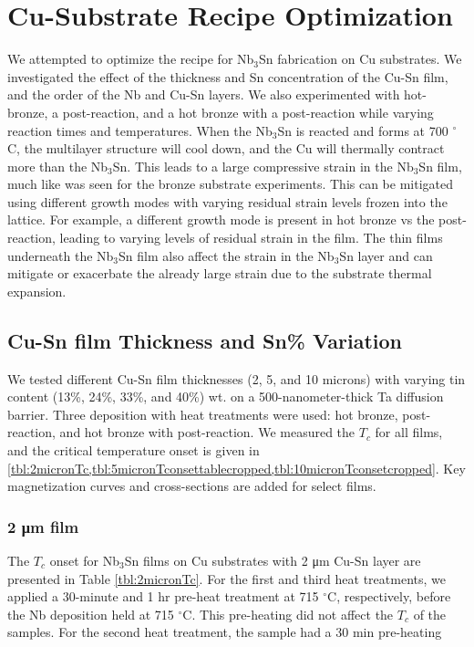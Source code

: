 
\chapter{Cu-Substrate Recipe Optimization}
    
We attempted to optimize the recipe for Nb$_3$Sn fabrication on Cu substrates. We investigated the effect of the thickness and Sn concentration of the Cu-Sn film, %
and the order of the Nb and Cu-Sn layers. We also experimented with hot-bronze, a post-reaction, and a hot bronze with a post-reaction while varying reaction times and temperatures. When the Nb$_3$Sn is reacted and forms at 700 $^{\circ}$C, the multilayer structure will cool down, and the Cu will thermally contract more than the Nb$_3$Sn. This leads to a large compressive strain in the Nb$_3$Sn film, much like was seen for the bronze substrate experiments. This can be mitigated using different growth modes with varying residual strain levels frozen into the lattice. For example, a different growth mode is present in hot bronze vs the post-reaction, leading to varying levels of residual strain in the film. The thin films underneath the Nb$_3$Sn film also affect the strain in the Nb$_3$Sn layer and can mitigate or exacerbate the already large strain due to the substrate thermal expansion.
    
    \section{Cu-Sn film Thickness and Sn\% Variation}

    We tested different Cu-Sn film thicknesses (2, 5, and 10 microns) with varying tin content (13\%, 24\%, 33\%, and 40\%) wt. on a 500-nanometer-thick Ta diffusion barrier. Three deposition with heat treatments were used: hot bronze, post-reaction, and hot bronze with post-reaction. We measured the $T_c$ for all films, and the critical temperature onset is given in \cref{tbl:2micronTc,tbl:5micronTconsettablecropped,tbl:10micronTconsetcropped}. Key magnetization curves and cross-sections are added for select films.


    \subsection{2 \si{\um} film}

    
    The $T_c$ onset for Nb$_3$Sn films on Cu substrates with 2 \si{\um} Cu-Sn layer are presented in Table \ref{tbl:2micronTc}. For the first and third heat treatments, we applied a 30-minute and 1 hr pre-heat treatment at 715 $^{\circ}$C, respectively, before the Nb deposition held at 715 $^{\circ}$C. This pre-heating did not affect the $T_c$ of the samples. For the second heat treatment, the sample had a 30 min pre-heating
    

